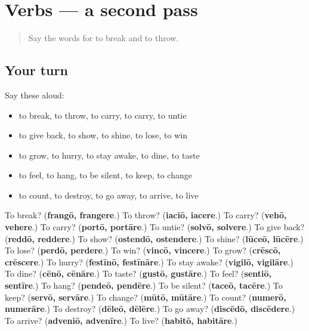 \section[(dialogue)]{Verbs — a second pass}

\label{lesson:LA-R160-second-pass-verbs}



\begin{quote}
Say the words for to break and to throw.
\end{quote}

\subsection*{Your turn}
Say these aloud:

\begin{itemize}
\raggedright
  \item to break, to throw, to carry, to carry, to untie
  \item to give back, to show, to shine, to lose, to win
  \item to grow, to hurry, to stay awake, to dine, to taste
  \item to feel, to hang, to be silent, to keep, to change
  \item to count, to destroy, to go away, to arrive, to live
\end{itemize}

\begin{tcolorbox}[breakable,colback=teal!4,colframe=teal!35!black,title={Before you move on}]
To break? (\textbf{frangō, frangere}.) To throw? (\textbf{iaciō, iacere}.) To carry? (\textbf{vehō, vehere}.) To carry? (\textbf{portō, portāre}.) To untie? (\textbf{solvō, solvere}.) To give back? (\textbf{reddō, reddere}.) To show? (\textbf{ostendō, ostendere}.) To shine? (\textbf{lūceō, lūcēre}.) To lose? (\textbf{perdō, perdere}.) To win? (\textbf{vincō, vincere}.) To grow? (\textbf{crēscō, crēscere}.) To hurry? (\textbf{festīnō, festīnāre}.) To stay awake? (\textbf{vigilō, vigilāre}.) To dine? (\textbf{cēnō, cēnāre}.) To taste? (\textbf{gustō, gustāre}.) To feel? (\textbf{sentiō, sentīre}.) To hang? (\textbf{pendeō, pendēre}.) To be silent? (\textbf{taceō, tacēre}.) To keep? (\textbf{servō, servāre}.) To change? (\textbf{mūtō, mūtāre}.) To count? (\textbf{numerō, numerāre}.) To destroy? (\textbf{dēleō, dēlēre}.) To go away? (\textbf{discēdō, discēdere}.) To arrive? (\textbf{adveniō, advenīre}.) To live? (\textbf{habitō, habitāre}.)
\end{tcolorbox}
